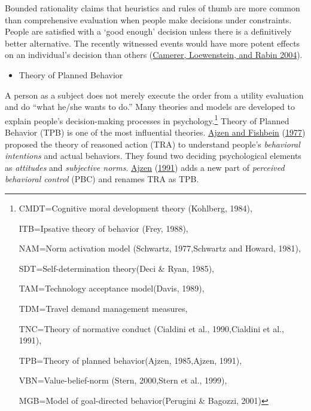 \documentclass[
  12pt,
]{article}
\providecommand{\tightlist}{%
  \setlength{\itemsep}{0pt}\setlength{\parskip}{0pt}}
\begin{document}
Bounded rationality claims that heuristics and rules of thumb are more common than comprehensive evaluation when people make decisions under constraints. People are satisfied with a `good enough' decision unless there is a definitively better alternative. The recently witnessed events would have more potent effects on an individual's decision than others (\protect\hyperlink{ref-camererAdvancesBehavioralEconomics2004}{Camerer, Loewenstein, and Rabin 2004}).

\begin{itemize}
\tightlist
\item
  Theory of Planned Behavior
\end{itemize}

A person as a subject does not merely execute the order from a utility evaluation and do ``what he/she wants to do.'' Many theories and models are developed to explain people's decision-making processes in psychology.\footnote{CMDT=Cognitive moral development theory (Kohlberg, 1984),

  ITB=Ipsative theory of behavior (Frey, 1988),

  NAM=Norm activation model (Schwartz, 1977,Schwartz and Howard, 1981),

  SDT=Self-determination theory(Deci \& Ryan, 1985),

  TAM=Technology acceptance model(Davis, 1989),

  TDM=Travel demand management measures,

  TNC=Theory of normative conduct (Cialdini et al., 1990,Cialdini et al., 1991),

  TPB=Theory of planned behavior(Ajzen, 1985,Ajzen, 1991),

  VBN=Value-belief-norm (Stern, 2000,Stern et al., 1999),

  MGB=Model of goal-directed behavior(Perugini \& Bagozzi, 2001)} Theory of Planned Behavior (TPB) is one of the most influential theories. \protect\hyperlink{ref-ajzenAttitudebehaviorRelationsTheoretical1977}{Ajzen and Fishbein} (\protect\hyperlink{ref-ajzenAttitudebehaviorRelationsTheoretical1977}{1977}) proposed the theory of reasoned action (TRA) to understand people's \emph{behavioral intentions} and actual behaviors. They found two deciding psychological elements as \emph{attitudes} and \emph{subjective norms}. \protect\hyperlink{ref-ajzenTheoryPlannedBehavior1991}{Ajzen} (\protect\hyperlink{ref-ajzenTheoryPlannedBehavior1991}{1991}) adds a new part of \emph{perceived behavioral control} (PBC) and renames TRA as TPB.
\end{document}

